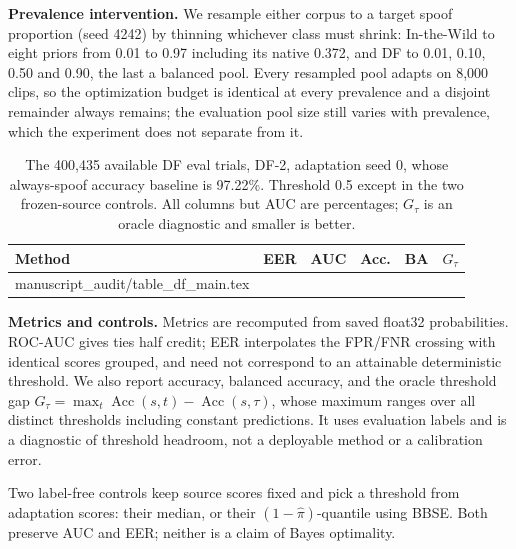 \documentclass[10pt,letterpaper]{article}
\makeatletter
\newcommand{\tablerows}[1]{\@@input #1 }
\makeatother
\begin{document}
\textbf{Prevalence intervention.} We resample either corpus to a target spoof
proportion (seed 4242) by thinning whichever class must shrink: In-the-Wild to
eight priors from 0.01 to 0.97 including its native 0.372, and DF to 0.01,
0.10, 0.50 and 0.90, the last a balanced pool. Every resampled pool adapts on
8,000 clips, so the optimization budget is identical at every prevalence and a
disjoint remainder always remains; the evaluation pool size still varies with
prevalence, which the experiment does not separate from it.

\begin{table}[t]
\centering
\caption{The 400,435 available DF eval trials, DF-2, adaptation seed 0, whose
always-spoof accuracy baseline is 97.22\%. Threshold 0.5 except in the two
frozen-source controls. All columns but AUC are percentages; $G_\tau$ is an
oracle diagnostic and smaller is better.}
\label{tab:df}
\footnotesize\setlength{\tabcolsep}{3pt}
\begin{tabular}{@{}lrrrrr@{}}
\toprule
Method & EER & AUC & Acc. & BA & $G_\tau$\\
\midrule
\tablerows{manuscript_audit/table_df_main.tex}
\bottomrule
\end{tabular}
\end{table}

\textbf{Metrics and controls.} Metrics are recomputed from saved float32
probabilities. ROC-AUC gives ties half credit; EER interpolates the FPR/FNR
crossing with identical scores grouped, and need not correspond to an
attainable deterministic threshold. We also
report accuracy, balanced accuracy, and the oracle threshold gap
$G_\tau=\max_t\operatorname{Acc}(s,t)-\operatorname{Acc}(s,\tau)$, whose
maximum ranges over all distinct thresholds including constant predictions. It
uses evaluation labels and is a diagnostic of threshold headroom, not a
deployable method or a calibration error.

Two label-free controls keep source scores fixed and pick a threshold from
adaptation scores: their median, or their $(1-\hat\pi)$-quantile using BBSE.
Both preserve AUC and EER; neither is a claim of Bayes optimality.
\end{document}
